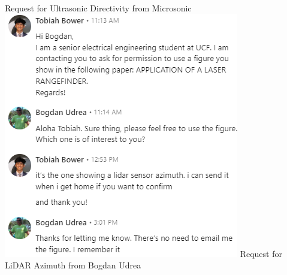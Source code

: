 
\begin{center}
\newline Request for Ultrasonic Directivity from Microsonic\\


\includegraphics[width=\textwidth]{./Images/permit2.png}
\newline Request for LiDAR Azimuth from Bogdan Udrea\\


\end{center}
